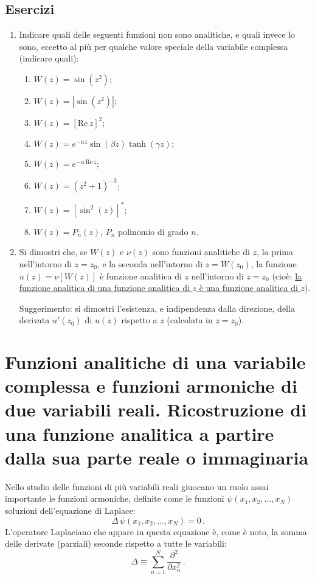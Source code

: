 \documentclass[11pt, a4paper]{book}
\numberwithin{equation}{section}
\newenvironment{esercizi}{\subsection*{Esercizi}\begin{enumerate}}{\end{enumerate}}
\begin{document}

\begin{esercizi}
\item Indicare quali delle seguenti funzioni non sono analitiche, e quali invece lo sono, eccetto al più per qualche valore speciale della variabile complessa (indicare quali):
\begin{enumerate}
\renewcommand{\theenumi}{\roman{enumi}}
\item $W(z) = \sin(z^2)$;
\item $W(z) = |\sin(z^2)|$;
\item $W(z) = [\mathrm{Re}\,z]^2$;
\item $W(z) = e^{-\alpha z}\sin(\beta z)\tanh(\gamma z)$;
\item $W(z) = e^{-\alpha\,\mathrm{Re}\,z}$;
\item $W(z) = (z^2+1)^{-3}$;
\item $W(z) = [\sin^2(z)]^*$;
\item $W(z) = P_n(z)$, $P_n$ polinomio di grado $n$.
\end{enumerate}
\item Si dimostri che, se $W(z)$ e $\nu(z)$ sono funzioni analitiche di $z$, la prima nell'intorno di $z = z_0$, e la seconda nell'intorno di $z = W(z_0)$, la funzione $u(z) = \nu[W(z)]$ è funzione analitica di $z$ nell'intorno di $z = z_0$ (cioè: \underline{la funzione analitica di una funzione analitica di $z$ è una funzione analitica di $z$}).

Suggerimento: si dimostri l'esistenza, e indipendenza dalla direzione, della derivata $u'(z_0)$ di $u(z)$ rispetto a $z$ (calcolata in $z = z_0$).
\end{esercizi}

\section[funzioni analitiche di 1 variabile complessa e armoniche di 2 variabili reali]{Funzioni analitiche di una variabile complessa e funzioni armoniche di due variabili reali. Ricostruzione di una funzione analitica a partire dalla sua parte reale o immaginaria}

Nello studio delle funzioni di più variabili reali giuocano un ruolo assai importante le funzioni armoniche, definite come le funzioni $\psi(x_1, x_2, \ldots, x_N)$ soluzioni dell'equazione di Laplace:
\begin{equation}
\Delta\,\psi(x_1, x_2, \ldots, x_N) = 0\,. \tag{1}
\end{equation}
L'operatore Laplaciano che appare in questa equazione è, come è noto, la somma delle derivate (parziali) seconde rispetto a tutte le variabili:
\begin{equation}
\Delta \equiv \sum_{n=1}^{N} \frac{\partial^2}{\partial x_n^2}\,. \tag{2}
\end{equation}
\end{document}

